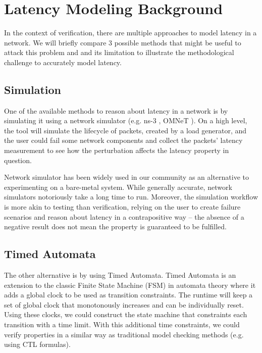 \section{Latency Modeling Background}
In the context of verification, there are multiple approaches to model latency in a network.
We will briefly compare 3 possible methods that might be useful to attack this problem and 
and its limitation to illustrate the methodological challenge to accurately model latency.

\subsection{Simulation}
One of the available methods to reason about latency in a network is by simulating it 
using a network simulator (e.g. ns-3 \cite{ns3}, OMNeT \cite{omnet}).
On a high level, the tool will simulate the lifecycle of packets, created by a load generator, 
and the user could fail some network components and collect the packets' latency measurement 
to see how the perturbation affects the latency property in question.

Network simulator has been widely used in our community as an alternative to experimenting on 
a bare-metal system. 
While generally accurate, network simulators notoriously take a long time to run.
Moreover, the simulation workflow is more akin to testing than verification, relying on 
the user to create failure scenarios and reason about latency in a contrapositive way -- 
the absence of a negative result does not mean the property is guaranteed to be fulfilled.

\subsection{Timed Automata}
The other alternative is by using Timed Automata.
Timed Automata is an extension to the classic Finite State Machine (FSM) in automata theory where it 
adds a global clock to be used as transition constraints. 
The runtime will keep a set of global clock that monotonously increases and can be individually 
reset.
Using these clocks, we could construct the state machine that constraints each transition with 
a time limit. 
With this additional time constraints, we could verify properties in a similar way 
as traditional model checking methods (e.g. using CTL formulas).


